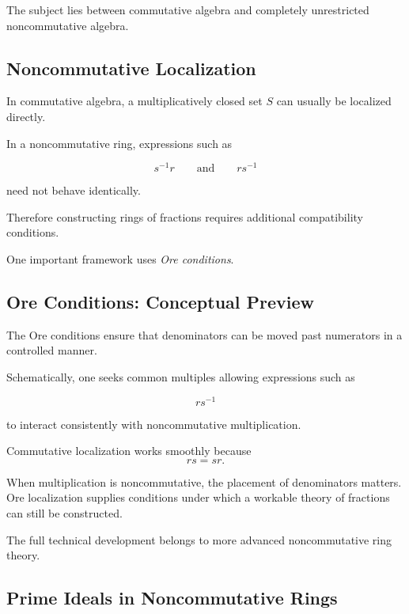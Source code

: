 The subject lies between commutative algebra and completely unrestricted
noncommutative algebra.

\subsection{Noncommutative Localization}
\label{subsec:noncommutative-localization}

In commutative algebra, a multiplicatively closed set \(S\) can usually be
localized directly.

In a noncommutative ring, expressions such as

\[ s^{-1}r \qquad\text{and}\qquad rs^{-1} \]

need not behave identically.

Therefore constructing rings of fractions requires additional compatibility
conditions.

One important framework uses \emph{Ore conditions}.

\subsection{Ore Conditions: Conceptual Preview}
\label{subsec:ore-condition-preview}

The Ore conditions ensure that denominators can be moved past numerators in
a controlled manner.

Schematically, one seeks common multiples allowing expressions such as

\[ rs^{-1} \]

to interact consistently with noncommutative multiplication.

\begin{conceptbox}
Commutative localization works smoothly because
\[ rs=sr. \]

When multiplication is noncommutative, the placement of denominators matters.
Ore localization supplies conditions under which a workable theory of
fractions can still be constructed.
\end{conceptbox}

The full technical development belongs to more advanced noncommutative ring
theory.

\subsection{Prime Ideals in Noncommutative Rings}
\label{subsec:noncommutative-prime-ideals}

